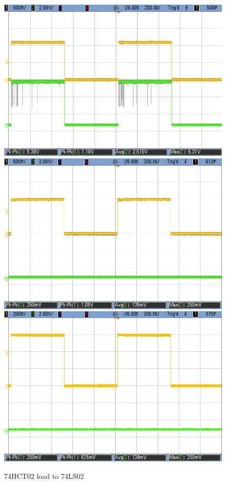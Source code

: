 \begin{figure}[h!]
	   \includegraphics[scale=0.19]{LS-HCT-1p1V.png}\\
	   \vspace{0.2cm}
        \includegraphics[scale=0.18]{HCT-LS-1V.png}\hspace{1cm}
        \includegraphics[scale=0.18]{HCT-LS-0p6V.png}
        \caption{\color{cyan}74HCT02 load to 74LS02}
        \label{fig:ej2exhcttols}
    \end{figure}

